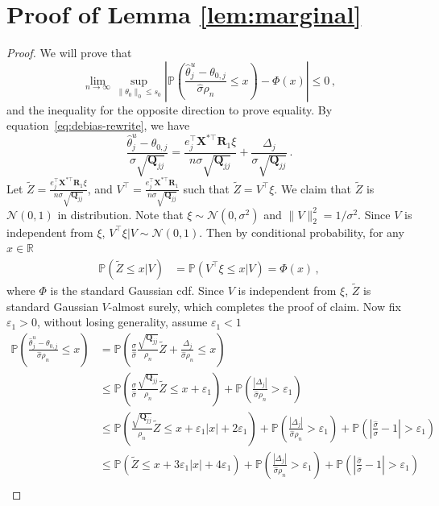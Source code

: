 \documentclass[11pt]{article}
\newcommand{\bX}{\boldsymbol{X}}
\newcommand{\bR}{\boldsymbol{R}}
\newcommand{\bQ}{\boldsymbol{Q}}
\newcommand{\mbR}{\mathbb{R}}
\newcommand{\mcN}{\mathcal{N}}
\newcommand{\Prob}{\mathbb{P}}
\newcommand{\hth}{\widehat{\theta}}
\begin{document}
\section{Proof of Lemma \ref{lem:marginal}}\label{pf:marginal}
\begin{proof}
    We will prove that 
    \[
     \lim_{n\to\infty}\sup_{\|\theta_0\|_0\leq s_0}\left|\Prob\left(\frac{\hth^u_j-\theta_{0,j}}{\widehat{\sigma}\rho_n}\leq x\right)-\Phi(x)\right| \leq 0\,,
    \]
    and the inequality for the opposite direction to prove equality.
    By equation~\eqref{eq:debias-rewrite}, we have
    \[
    \frac{\hth^u_j-\theta_{0,j}}{\sigma\sqrt{\bQ_{jj}}}=\frac{e_j^\top\bX^{*\top}\bR_1\xi}{n \sigma\sqrt{\bQ_{jj}}}+\frac{\Delta_j}{\sigma\sqrt{\bQ_{jj}}}\,.
    \]
    Let $\tilde{Z} = \frac{e_j^\top\bX^{*\top}\bR_1\xi}{n \sigma\sqrt{\bQ_{jj}}}$, and $V^\top = \frac{e_j^\top\bX^{*\top}\bR_1}{n\sigma\sqrt{\bQ_{jj}}}$ such that $\tilde{Z}=V^\top\xi$. We claim that $\tilde{Z}$ is $\mcN(0,1)$ in distribution. Note that $\xi\sim\mcN(0,\sigma^2)$ and $\|V\|^2_2=1/\sigma^2$. Since $V$ is independent from $\xi$, $V^\top\xi|V \sim \mcN(0,1)$. Then by conditional probability, for any $x\in\mbR$
    \begin{align*}
         \Prob(\tilde{Z}\le x|V)&=\Prob(V^\top \xi\le x|V)= \Phi(x)\,,
    \end{align*}
    where $\Phi$ is the standard Gaussian cdf. Since $V$ is independent from $\xi$, $\tilde{Z}$ is standard Gaussian $V$-almost surely, which completes the proof of claim. Now fix $\varepsilon_1>0$, without losing generality, assume $\varepsilon_1<1$
    \begin{align*}
        \Prob\left(\frac{\hth^u_j-\theta_{0,j}}{\widehat{\sigma}\rho_n}\leq x\right)&=\Prob\left(\frac{\sigma}{\widehat{\sigma}}\frac{\sqrt{\bQ_{jj}}}{\rho_n}\tilde{Z}+\frac{\Delta_j}{\widehat{\sigma}\rho_n}\leq x\right)\\
        &\leq \Prob\left(\frac{\sigma}{\widehat{\sigma}}\frac{\sqrt{\bQ_{jj}}}{\rho_n}\tilde{Z}\leq x+\varepsilon_1\right)+\Prob\left(\frac{|\Delta_j|}{\widehat{\sigma}\rho_n}>\varepsilon_1\right)\\
        &\leq \Prob\left(\frac{\sqrt{\bQ_{jj}}}{\rho_n}\tilde{Z}\leq x+\varepsilon_1|x|+2\varepsilon_1\right)+\Prob\left(\frac{|\Delta_j|}{\widehat{\sigma}\rho_n}>\varepsilon_1\right)+\Prob\left(\left|\frac{\widehat{\sigma}}{\sigma}-1\right|>\varepsilon_1\right)\\
        &\leq \Prob\left(\tilde{Z}\leq x+3\varepsilon_1|x|+4\varepsilon_1\right)+\Prob\left(\frac{|\Delta_j|}{\widehat{\sigma}\rho_n}>\varepsilon_1\right)+\Prob\left(\left|\frac{\widehat{\sigma}}{\sigma}-1\right|>\varepsilon_1\right)\\

\end{align*}
\end{proof}
\end{document}
